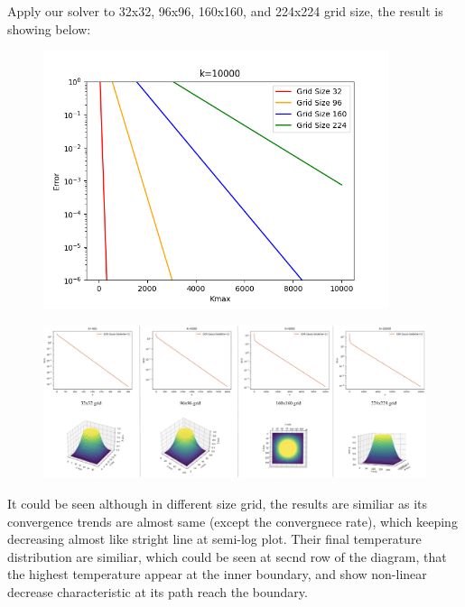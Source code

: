 \documentclass[12pt]{article}
\begin{document}
Apply our solver to 32x32, 96x96, 160x160, and 224x224 grid size, the result is showing
below:



\begin{figure}[H]
    \centering
    \includegraphics[width=0.9\textwidth]{Cnvergence4grids.png}
    \label{Cnvergence4grids.png}
\end{figure}



\begin{figure}[H]
    \centering
    \includegraphics[width=1\textwidth]{(a)showall.jpg}
    \label{(a)showall.jpg}
\end{figure}



It could be seen although in different size grid, the results are
similiar as its convergence trends are almost same
(except the convergnece rate), which keeping decreasing almost like
stright line at semi-log plot. Their final temperature distribution
are similiar, which could be seen at secnd row of the diagram,
that the highest temperature appear at the inner boundary, and 
show non-linear decrease characteristic at its path
reach the boundary.\\
\end{document}
